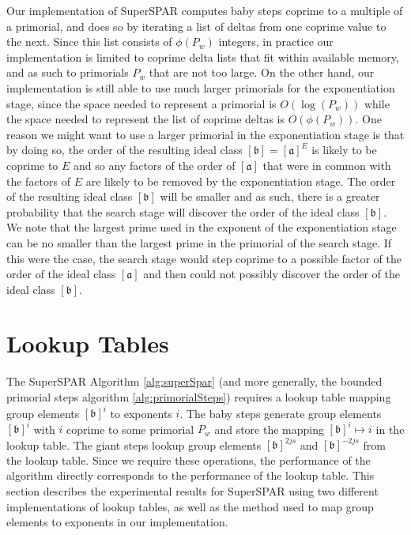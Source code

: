 \documentclass{ucalgthes1}
\theoremstyle{definition}
\newcommand{\ideal}{\mathfrak}
\newcommand{\idealclass}[1]{\left[ \ideal #1 \right]}
\newcommand{\aclass}{\idealclass a}
\newcommand{\bclass}{\idealclass b}
\begin{document}
Our implementation of SuperSPAR computes baby steps coprime to a multiple of a primorial, and does so by iterating a list of deltas from one coprime value to the next.  Since this list consists of $\phi(P_w)$ integers, in practice our implementation is limited to coprime delta lists that fit within available memory, and as such to primorials $P_w$ that are not too large.  On the other hand, our implementation is still able to use much larger primorials for the exponentiation stage, since the space needed to represent a primorial is $O(\log(P_w))$ while the space needed to represent the list of coprime deltas is $O(\phi(P_w))$.  One reason we might want to use a larger primorial in the exponentiation stage is that by doing so, the order of the resulting ideal class $\bclass = \aclass^E$ is likely to be coprime to $E$ and so any factors of the order of $\aclass$ that were in common with the factors of $E$ are likely to be removed by the exponentiation stage.  The order of the resulting ideal class $\bclass$ will be smaller and as such, there is a greater probability that the search stage will discover the order of the ideal class $\bclass$.  We note that the largest prime used in the exponent of the exponentiation stage can be no smaller than the largest prime in the primorial of the search stage.  If this were the case, the search stage would step coprime to a possible factor of the order of the ideal class $\aclass$ and then could not possibly discover the order of the ideal class $\bclass$.


\section{Lookup Tables}
\label{sec:ssparHashing}

The SuperSPAR Algorithm \ref{alg:superSpar} (and more generally, the bounded primorial steps algorithm \ref{alg:primorialSteps}) requires a lookup table mapping group elements $\bclass^i$ to exponents $i$.  The baby steps generate group elements $\bclass^i$ with $i$ coprime to some primorial $P_w$ and store the mapping $\bclass^i \mapsto i$ in the lookup table. The giant steps lookup group elements $\bclass^{2js}$ and $\bclass^{-2js}$ from the lookup table.  Since we require these operations, the performance of the algorithm directly corresponds to the performance of the lookup table.  This section describes the experimental results for SuperSPAR using two different implementations of lookup tables, as well as the method used to map group elements to exponents in our implementation.
\end{document}
